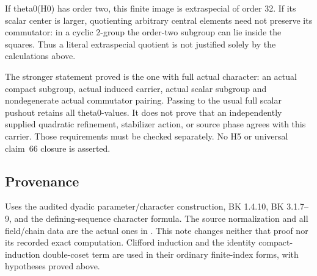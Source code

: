 If theta0(H0) has order two, this finite image is extraspecial of order
32. If its scalar center is larger, quotienting arbitrary central
elements need not preserve its commutator: in a cyclic 2-group the
order-two subgroup can lie inside the squares. Thus a literal
extraspecial quotient is not justified solely by the calculations above.

The stronger statement proved is the one with full actual character: an
actual compact subgroup, actual induced carrier, actual scalar subgroup
and nondegenerate actual commutator pairing. Passing to the usual full
scalar pushout retains all theta0-values. It does not prove that an
independently supplied quadratic refinement, stabilizer action, or
source phase agrees with this carrier. Those requirements must be
checked separately. No H5 or universal claim~66 closure is asserted.

\hypertarget{rank4-provenance}{%
\subsection{Provenance}\label{rank4-provenance}}

Uses the audited dyadic parameter/character construction, BK 1.4.10,
BK 3.1.7--9, and the defining-sequence character formula. The source
normalization and all field/chain data are the actual ones in
. This note changes neither that
proof nor its recorded exact computation. Clifford induction and the
identity compact-induction double-coset term are used in their ordinary
finite-index forms, with hypotheses proved above.
